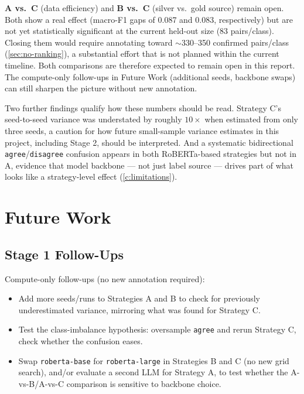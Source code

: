 \textbf{A vs.\ C} (data efficiency) and \textbf{B vs.\ C} (silver vs.\
gold source) remain open. Both show a real effect (macro-F1 gaps of
0.087 and 0.083, respectively) but are not yet statistically significant
at the current held-out size (83 pairs/class). Closing them would
require annotating toward $\sim$330--350 confirmed pairs/class
(\autoref{sec:no-ranking}), a substantial effort that is not planned
within the current timeline. Both comparisons are therefore expected to
remain open in this report. The compute-only follow-ups in Future Work
(additional seeds, backbone swaps) can still sharpen the picture without
new annotation.

Two further findings qualify how these numbers should be read. Strategy
C's seed-to-seed variance was understated by roughly $10\times$ when
estimated from only three seeds, a caution for how future small-sample
variance estimates in this project, including Stage 2, should be
interpreted. And a systematic bidirectional \texttt{agree}/\texttt{disagree}
confusion appears in both RoBERTa-based strategies but not in A, evidence
that model backbone --- not just label source --- drives part of what
looks like a strategy-level effect (\autoref{c:limitations}).


\chapter{Future Work}
\label{sec:future-work}

\section{Stage 1 Follow-Ups}

Compute-only follow-ups (no new annotation required):

\begin{itemize}
\item Add more seeds/runs to Strategies A and B to check for previously
      underestimated variance, mirroring what was found for Strategy C.
\item Test the class-imbalance hypothesis: oversample \texttt{agree} and
      rerun Strategy C, check whether the confusion eases.
\item Swap \texttt{roberta-base} for \texttt{roberta-large} in Strategies B
      and C (no new grid search), and/or evaluate a second LLM for
      Strategy A, to test whether the A-vs-B/A-vs-C comparison is
      sensitive to backbone choice.
\end{itemize}

